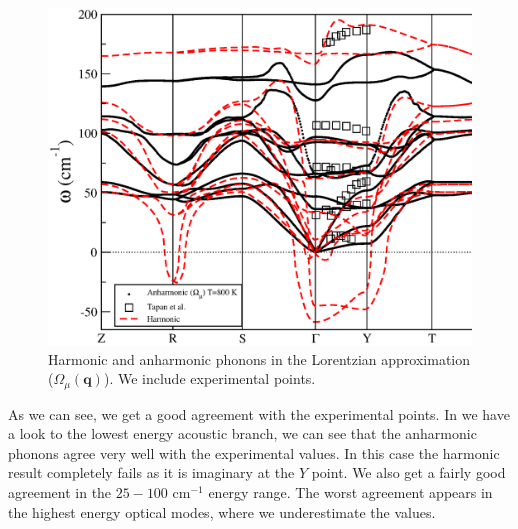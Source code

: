 \begin{figure}[h]
\includegraphics[width=\linewidth]{Figures/exp-vs-theory.eps}
\caption[Comparison of phonons in the Lorentzian approximation and INS experiments.]{Harmonic and anharmonic phonons in the Lorentzian approximation ($\Omega_{\mu}(\mathbf{q})$). We include experimental points\cite{chatterji2018soft}.}
\label{phonon-exp}
\end{figure}
As we can see, we get a good agreement with the experimental points. In we have a look to the lowest energy acoustic branch, we can see that the anharmonic phonons agree very well with the experimental values. In this case the harmonic result completely fails as it is imaginary at the $Y$ point. We also get a fairly good agreement in the $25-100$ cm$^{-1}$ energy range. The worst agreement appears in the highest energy optical modes, where we underestimate the values. \\

